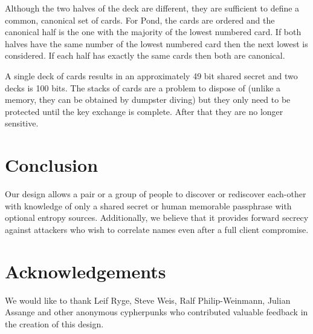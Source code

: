 \documentclass[letterpaper,twocolumn,10pt]{article}
\begin{document}
Although the two halves of the deck are different, they are sufficient to
define a common, canonical set of cards. For Pond, the cards are ordered and
the canonical half is the one with the majority of the lowest numbered card. If
both halves have the same number of the lowest numbered card then the next
lowest is considered. If each half has exactly the same cards then both are
canonical.

A single deck of cards results in an approximately 49 bit shared secret and two
decks is 100 bits. The stacks of cards are a problem to dispose of (unlike a
memory, they can be obtained by dumpster diving) but they only need to be
protected until the key exchange is complete. After that they are no longer
sensitive.

\section{Conclusion}

Our design allows a pair or a group of people to discover or rediscover
each-other with knowledge of only a shared secret or human memorable
passphrase with optional entropy sources. Additionally, we believe that it
provides forward secrecy against attackers who wish to correlate names even
after a full client compromise.

\section*{Acknowledgements}

We would like to thank Leif Ryge, Steve Weis, Ralf Philip-Weinmann, Julian
Assange and other anonymous cypherpunks who contributed valuable feedback in
the creation of this design.

{\footnotesize 
}
\end{document}
